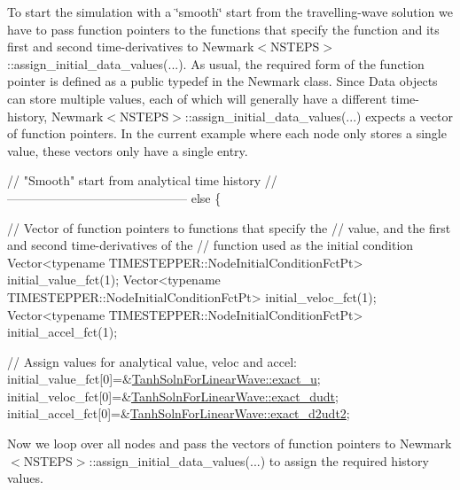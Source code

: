 To start the simulation with a \char`\"{}smooth\char`\"{} start from the travelling-\/wave solution we have to pass function pointers to the functions that specify the function and its first and second time-\/derivatives to {\ttfamily Newmark$<$\+N\+S\+T\+E\+P\+S$>$\+::assign\+\_\+initial\+\_\+data\+\_\+values}(...). As usual, the required form of the function pointer is defined as a public {\ttfamily typedef} in the Newmark class. Since {\ttfamily Data} objects can store multiple values, each of which will generally have a different time-\/history, {\ttfamily Newmark$<$\+N\+S\+T\+E\+P\+S$>$\+::assign\+\_\+initial\+\_\+data\+\_\+values}(...) expects a vector of function pointers. In the current example where each node only stores a single value, these vectors only have a single entry.


\begin{DoxyCodeInclude}

 \textcolor{comment}{// "Smooth" start from analytical time history}
 \textcolor{comment}{//--------------------------------------------}
 \textcolor{keywordflow}{else}
  \{

   \textcolor{comment}{// Vector of function pointers to functions that specify the}
   \textcolor{comment}{// value, and the first and second time-derivatives of the}
   \textcolor{comment}{// function used as the initial condition}
   Vector<typename TIMESTEPPER::NodeInitialConditionFctPt> 
    initial\_value\_fct(1);
   Vector<typename TIMESTEPPER::NodeInitialConditionFctPt>
    initial\_veloc\_fct(1);
   Vector<typename TIMESTEPPER::NodeInitialConditionFctPt> 
    initial\_accel\_fct(1);
   
   \textcolor{comment}{// Assign values for analytical value, veloc and accel:}
   initial\_value\_fct[0]=&\hyperlink{namespaceTanhSolnForLinearWave_aceea2935b2d3815ce72aae8c9de2b468}{TanhSolnForLinearWave::exact\_u};
   initial\_veloc\_fct[0]=&\hyperlink{namespaceTanhSolnForLinearWave_aa2081bd3d3d518a38497f664b0e498bc}{TanhSolnForLinearWave::exact\_dudt};
   initial\_accel\_fct[0]=&\hyperlink{namespaceTanhSolnForLinearWave_a63b7a0f5fd5d06cc2c0a43322a81fe43}{TanhSolnForLinearWave::exact\_d2udt2};

\end{DoxyCodeInclude}


Now we loop over all nodes and pass the vectors of function pointers to {\ttfamily Newmark$<$\+N\+S\+T\+E\+P\+S$>$\+::assign\+\_\+initial\+\_\+data\+\_\+values}(...) to assign the required history values.



